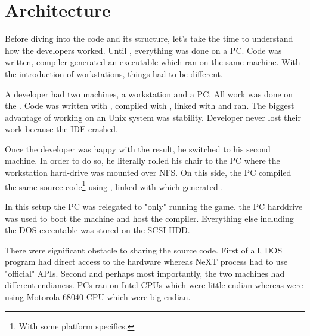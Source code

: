 \section{Architecture}
Before diving into the code and its structure, let's take the time to understand how the developers worked. Until \doom, everything was done on a PC. Code was written, compiler generated an executable which ran on the same machine. With the introduction of \NeXT workstations, things had to be different.\\
\par
A developer had two machines, a \NeXT workstation and a PC. All work was done on the \NeXT. Code was written with , compiled with , linked with  and ran. The biggest advantage of working on an Unix system was stability. Developer never lost their work because the IDE crashed.\\
\par
Once the developer was happy with the result, he switched to his second machine. In order to do so, he literally rolled his chair to the PC where the \NeXT workstation hard-drive was mounted over NFS. On this side, the PC compiled the same source code\footnote{With some platform specifics.} using , linked with  which generated .\\
\par
 In this setup the PC was relegated to "only" running the game. the PC harddrive was used to boot the machine and host the compiler. Everything else including the DOS executable was stored on the \NeXT SCSI HDD.\\
\par
There were significant obstacle to sharing the source code. First of all, DOS program had direct access to the hardware whereas NeXT process had to use "official" APIs. Second and perhaps most importantly, the two machines had different endianess. PCs ran on Intel CPUs which were little-endian whereas \NeXT were using Motorola 68040 CPU which were big-endian.\\
\par
\begin{figure}[H]
\centering
{}
\end{figure}
\par



